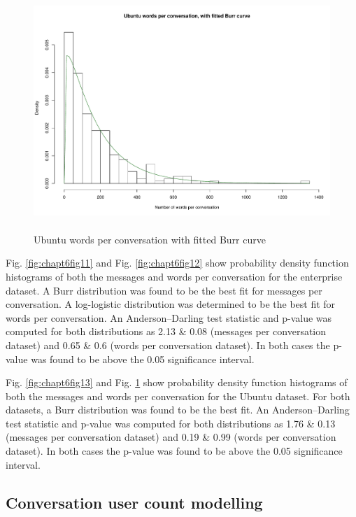\begin{figure}
\begin{center}
\caption{Ubuntu words per conversation with fitted Burr curve}
\label{fig:chapt6fig14}
\includegraphics[height=9cm, width=13cm]{graphs/different/14_words_ubuntu.pdf} 
\end{center}
\end{figure}


Fig. \ref{fig:chapt6fig11} and Fig. \ref{fig:chapt6fig12}  show probability density function histograms of both the messages and words per conversation for the enterprise dataset. 
 A Burr distribution was found to be the best fit for messages per conversation. A log-logistic distribution was determined to be the best fit for words per conversation.  An Anderson--Darling test statistic and p-value was computed for both distributions as 2.13 \& 0.08 (messages per conversation dataset) and 0.65 \& 0.6 (words per conversation dataset). In both cases the p-value was found to be above the 0.05 significance interval.

Fig. \ref{fig:chapt6fig13} and Fig. \ref{fig:chapt6fig14}  show probability density function histograms of both the messages and words per conversation for the Ubuntu dataset. 
For both datasets, a Burr distribution was found to be the best fit. An Anderson--Darling test statistic and p-value was computed for both distributions as 1.76 \& 0.13 (messages per conversation dataset) and 0.19 \&  0.99 (words per conversation dataset). In both cases the p-value was found to be above the 0.05 significance interval.

\subsection{Conversation user count modelling}

